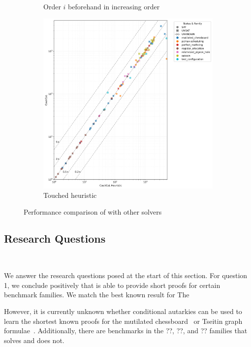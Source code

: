 \begin{figure}[!t]
\begin{subfigure}[t]{0.3\textwidth}
        \caption{Order $i$ beforehand in increasing order}
        \label{fig:cautical-vs-prelearn}
    \end{subfigure}
    \begin{subfigure}[t]{0.3\textwidth}
        \centering
        \includegraphics[width=\textwidth]{figs/globaltouch_heuristic_comparison.jpg}
        \caption{Touched heuristic}
        \label{fig:cautical-vs-prelearn}
    \end{subfigure}

    \caption{Performance comparison of \tool with other solvers}
    \label{fig:solver-comparison}
\end{figure}


\subsection{Research Questions}~\label{subsec:eval-research-questions}

We answer the research questions posed at the start of this section. For
question 1, we conclude positively that \tool is able to provide short \pr
proofs for certain benchmark families. We match the best known result for The

However, it is currently unknown whether conditional autarkies can be used to
learn the shortest known \pr proofs for the mutilated
chessboard~\cite{mutilatedchessboard-pr} or Tseitin graph
formulae~\cite{sadical}. Additionally, there are benchmarks in the ??, ??, and
?? families that \prelearn solves and \tool does not.

